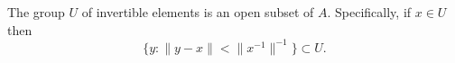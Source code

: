 The group $U$ of invertible elements is an open subset of $A$. Specifically, if $x \in U$ then
$$\{y : \|y - x\| < \|x^{-1}\|^{-1}\} \subset U.$$
